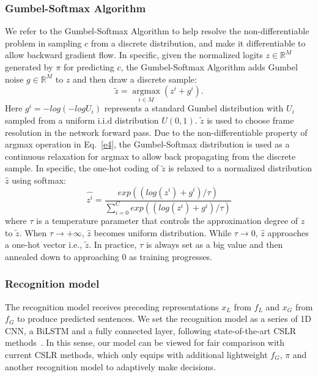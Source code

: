 \documentclass[sigconf]{acmart}
\begin{document}
\subsubsection{Gumbel-Softmax Algorithm}
We refer to the Gumbel-Softmax Algorithm\cite{jang2016categorical} to help resolve the non-differentiable problem in sampling $c$ from a discrete distribution, and make it differentiable to allow backward gradient flow. In specific, given the normalized logits $z \in \mathbb{R}^{M}$ generated by $\pi$ for predicting $c$, the Gumbel-Softmax Algorithm adds Gumbel noise $g \in \mathbb{R}^{M}$ to $z$ and then draw a discrete sample:
  \begin{equation}
  \label{e4}
    \tilde{z}=\mathop{argmax}\limits_{i \in M}(z^i+g^i).
  \end{equation}
Here $g^i=-log(-logU_i)$ represents a standard Gumbel distribution with $U_i$ sampled from a uniform i.i.d distribution $U(0,1)$. $\tilde{z}$ is used to choose frame resolution in the network forward pass. Due to the non-differentiable property of argmax operation in Eq.~\ref{e4}, the Gumbel-Softmax distribution is used as a continuous relaxation for argmax to allow back propagating from the discrete sample. In specific, the one-hot coding of $\tilde{z}$ is relaxed to a normalized distribution $\hat{z}$ using softmax:
  \begin{equation}
  \label{e5}
    \hat{z^i}=\frac{exp((log(z^i)+g^i)/\tau)}{\sum_{i=0}^C exp((log(z^i)+g^i)/\tau)}
  \end{equation}
where $\tau$ is a temperature parameter that controls the approximation degree of $\hat{z}$ to $\tilde{z}$. When $\tau \to +\infty$, $\hat{z}$ becomes uniform distribution. While $\tau \to 0$, $\hat{z}$ approaches a one-hot vector i.e., $\tilde{z}$. In practice, $\tau$ is always set as a big value and then annealed down to approaching 0 as training progresses.

\subsubsection{Recognition model}
The recognition model receives preceding representations $x_L$ from $f_L$ and $x_G$ from $f_G$ to produce predicted sentences. We set the recognition model as a series of 1D CNN, a BiLSTM and a fully connected layer, following state-of-the-art CSLR methods~\cite{Min_2021_ICCV,hao2021self}. In this sense, our model can be viewed for fair comparison with current CSLR methods, which only equips with additional lightweight $f_G$, $\pi$ and another recognition model to adaptively make decisions.
  
\end{document}
